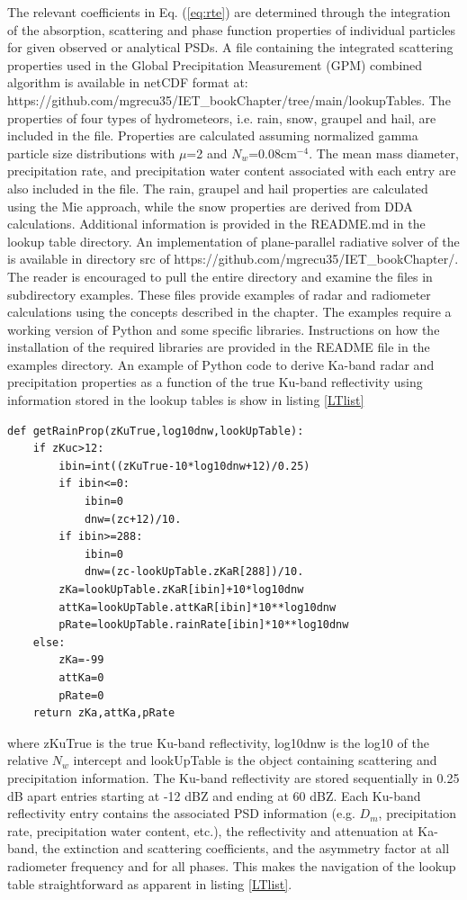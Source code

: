 \documentclass[10pt]{ietbook}
\begin{document}
The relevant coefficients in Eq. (\ref{eq:rte}) are determined through the integration of the absorption, scattering and phase function
properties of individual particles for given observed or analytical PSDs. A file containing the integrated scattering properties used in 
the Global Precipitation Measurement (GPM) combined algorithm \cite{grecu2016} is available in netCDF format at:\\
https://github.com/mgrecu35/IET\_bookChapter/tree/main/lookupTables.
The properties of four types of hydrometeors, i.e. rain, snow, graupel and hail, are included in the file. Properties are calculated assuming
normalized gamma particle size distributions with $\mu$=2 and $N_w$=0.08cm$^{-4}$.  The mean mass diameter, precipitation rate,
and precipitation water content associated with each entry are also included in the file. The rain, graupel and hail properties are calculated using
the Mie approach, while the snow properties are derived from DDA calculations. Additional information is provided in the README.md in the lookup table
directory. An implementation of plane-parallel radiative solver of the \cite{kummerow1993} is available in directory src of 
https://github.com/mgrecu35/IET\_bookChapter/.  The reader is encouraged to pull the entire directory and examine the files in subdirectory examples.
These files provide examples of radar and radiometer calculations using the concepts described in the chapter.  The examples require a working
version of Python and some specific libraries.  Instructions on how the installation of the required libraries are provided in the README file
in the examples directory.  An example of Python code to derive Ka-band radar and precipitation properties as a function of the true Ku-band 
reflectivity using information stored in the lookup tables is show in listing \ref{LTlist}
\begin{lstlisting}[caption={Python implementation of a scattering lookup table interface function.},captionpos=b,label={LTlist}]
def getRainProp(zKuTrue,log10dnw,lookUpTable):
    if zKuc>12:
        ibin=int((zKuTrue-10*log10dnw+12)/0.25)
        if ibin<=0:
            ibin=0
            dnw=(zc+12)/10.
        if ibin>=288:
            ibin=0
            dnw=(zc-lookUpTable.zKaR[288])/10.
        zKa=lookUpTable.zKaR[ibin]+10*log10dnw
        attKa=lookUpTable.attKaR[ibin]*10**log10dnw
        pRate=lookUpTable.rainRate[ibin]*10**log10dnw
    else:
        zKa=-99
        attKa=0
        pRate=0
    return zKa,attKa,pRate
\end{lstlisting}
where zKuTrue is the true Ku-band reflectivity, log10dnw is the log10 of the relative $N_w$ intercept and lookUpTable is the object containing scattering
and precipitation information.  The Ku-band reflectivity are stored sequentially in 0.25 dB apart entries starting at -12 dBZ and ending at 60 dBZ.  Each Ku-band
reflectivity entry contains the associated PSD information (e.g. $D_m$, precipitation rate, precipitation water content, etc.), the reflectivity and attenuation
at Ka-band, the extinction and scattering coefficients, and the asymmetry factor at all radiometer frequency and for all phases. This makes the navigation of
the lookup table straightforward as apparent in listing \ref{LTlist}.
\end{document}
